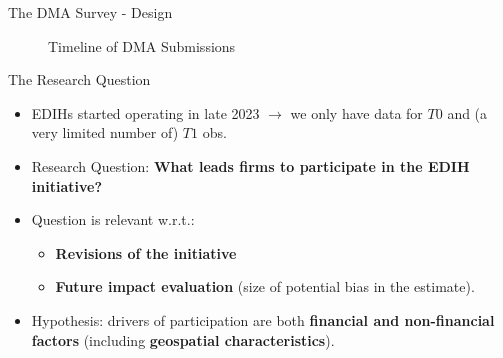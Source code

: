 \documentclass{beamer}
\begin{document}
\begin{frame}{The DMA Survey - Design}
\begin{figure}
        \caption{Timeline of DMA Submissions}
        \label{fig:timeline}
    \end{figure}
\end{frame}

\begin{frame}{The Research Question}
    \begin{itemize}
        \item EDIHs started operating in late 2023 $\to$ we only have data for $T0$ and (a very limited number of) $T1$ obs.
        \item Research Question: \textbf{What leads firms to participate in the EDIH initiative?}
        \item Question is relevant w.r.t.:
            \begin{itemize}
                \item \textbf{Revisions of the initiative}
                \item \textbf{Future impact evaluation} (size of potential bias in the estimate).
            \end{itemize} 
        \item Hypothesis: drivers of participation are both \textbf{financial and non-financial factors} (including \textbf{geospatial characteristics}).
    \end{itemize}
\end{frame}
\end{document}
